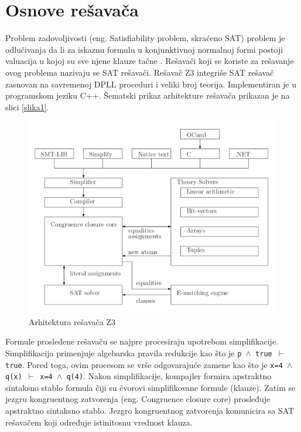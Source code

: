 \documentclass[12pt,oneside]{memoir}
\begin{document}
\section{Osnove rešavača}  \label{sec:num1}
Problem zadovoljivosti (eng. Satisfiability problem, skraćeno SAT) problem je odlučivanja da li za iskaznu formulu u konjunktivnoj normalnoj formi postoji valuacija u kojoj su sve njene 
klauze tačne \cite{Handbook}. 
Rešavači koji se koriste za rešavanje ovog problema nazivaju se SAT rešavači.   
Rešavač Z3 integriše SAT rešavač zasnovan na savremenoj DPLL proceduri i veliki broj teorija. 
Implementiran je u programskom jeziku C++. Šematski prikaz arhitekture \cite{EfficientSMTSolver} rešavača prikazan je na slici \ref{slika1}. 
\begin{figure}[!ht]\label{slika1}
  \centering
  \includegraphics[width=1\textwidth]{arhitektura.png}
  \caption{Arhitektura rešavača Z3}
  \label{fig:arhitektura}
\end{figure}
\par
Formule prosleđene rešavaču se najpre procesiraju upotrebom simplifikacije. Simplifikacija primenjuje algebarska pravila redukcije kao što je \texttt{p $\land$ true $\vdash$ true}. Pored toga, ovim procesom se vrše odgovarajuće zamene kao što je \texttt{x=4 $\land$ q(x) $\vdash$ x=4 $\land$ q(4)}.
Nakon simplifikacije, kompajler formira apstraktno sintaksno stablo formula čiji su čvorovi simplifikovane formule (klauze). Zatim se jezgru kongruentnog zatvorenja (eng. Congruence closure core) prosleđuje apstraktno sintaksno stablo. Jezgro kongruentnog zatvorenja komunicira sa SAT rešavačem koji određuje istinitosnu vrednost klauza. 
\end{document}
